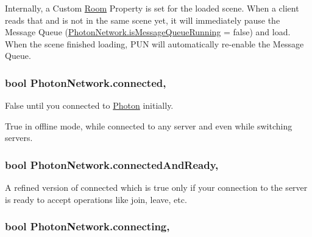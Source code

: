 Internally, a Custom \hyperlink{class_room}{Room} Property is set for the loaded scene. When a client reads that and is not in the same scene yet, it will immediately pause the Message Queue (\hyperlink{class_photon_network_a9cf8214080471001a1a32e17eff9b402}{Photon\+Network.\+is\+Message\+Queue\+Running} = false) and load. When the scene finished loading, P\+UN will automatically re-\/enable the Message Queue. 
\subsubsection[{\texorpdfstring{connected}{connected}}]{\setlength{\rightskip}{0pt plus 5cm}bool Photon\+Network.\+connected\hspace{0.3cm}{\ttfamily [static]}, {\ttfamily [get]}}\hypertarget{class_photon_network_ad96fd99b5e9384771ee44b427edf7487}{}\label{class_photon_network_ad96fd99b5e9384771ee44b427edf7487}


False until you connected to \hyperlink{namespace_photon}{Photon} initially. 

True in offline mode, while connected to any server and even while switching servers. 
\subsubsection[{\texorpdfstring{connected\+And\+Ready}{connectedAndReady}}]{\setlength{\rightskip}{0pt plus 5cm}bool Photon\+Network.\+connected\+And\+Ready\hspace{0.3cm}{\ttfamily [static]}, {\ttfamily [get]}}\hypertarget{class_photon_network_a7698c3e61503df2cb5375ffc3182fb1f}{}\label{class_photon_network_a7698c3e61503df2cb5375ffc3182fb1f}


A refined version of connected which is true only if your connection to the server is ready to accept operations like join, leave, etc. 

\subsubsection[{\texorpdfstring{connecting}{connecting}}]{\setlength{\rightskip}{0pt plus 5cm}bool Photon\+Network.\+connecting\hspace{0.3cm}{\ttfamily [static]}, {\ttfamily [get]}}\hypertarget{class_photon_network_a0141dc0df0d2e0a7fcda2e2101c44254}{}\label{class_photon_network_a0141dc0df0d2e0a7fcda2e2101c44254}


